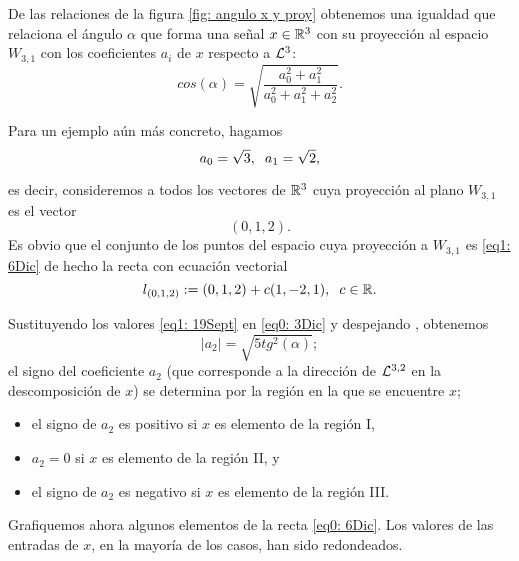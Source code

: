 {De las relaciones de la figura 
\ref{fig: angulo x y proy} 
obtenemos una igualdad que relaciona el ángulo 
$\alpha$ que forma una señal $x \in \mathbb{R}^{3}$ 
con su proyección al espacio $W_{3,1}$
con los coeficientes $a_{i}$
de $x$ respecto a $\mathcal{L}^{3}$:
\begin{equation}
\label{eq0: 3Dic}
cos(\alpha)= \sqrt{\frac{a_{0}^{2}+a_{1}^{2}}{a_{0}^{2}+a_{1}^{2}+a_{2}^{2}}}.
\end{equation}

Para un ejemplo aún más concreto, hagamos 
\begin{equation}
\label{eq1: 19Sept}
a_{0}= \sqrt{3}, \hspace{0.2cm} a_{1}= \sqrt{2},
\end{equation}


\noindent
es decir, consideremos a todos los vectores de $\mathbb{R}^{3}$
cuya proyección al plano $W_{3,1}$ es 
el vector
\begin{equation}
\label{eq1: 6Dic}
(0,1,2).
\end{equation}
Es obvio que el conjunto de los puntos
del espacio cuya proyección a
$W_{3,1}$ es \eqref{eq1: 6Dic} de hecho la recta
con ecuación vectorial
\begin{equation}
\label{eq0: 6Dic}
l_{(0,1,2)} := (0,1,2)+c(1,-2,1), \hspace{0.2cm} c \in \mathbb{R}.
\end{equation}

\noindent
Sustituyendo
los valores \eqref{eq1: 19Sept} en \eqref{eq0: 3Dic} y
despejando
, obtenemos 
\[
|a_{2}|= \sqrt{5 tg^{2}(\alpha)};
\]
el signo del coeficiente $a_{2}$ (que corresponde a la dirección
de $\mathcal{L}^{3,2}$ en la descomposición de $x$) se determina por
la región en la que se encuentre $x$;

\begin{itemize}
\item el signo de $a_{2}$ es positivo si $x$ es elemento de la región I,
\item $a_{2}=0$ si $x$ es elemento de la región II, y
\item el signo de $a_{2}$ es negativo si $x$ es elemento de la región III.
\end{itemize}


Grafiquemos ahora algunos elementos
de la recta \eqref{eq0: 6Dic}.
Los valores de las entradas de $x$, en la
mayoría de los casos, han sido redondeados.


}
